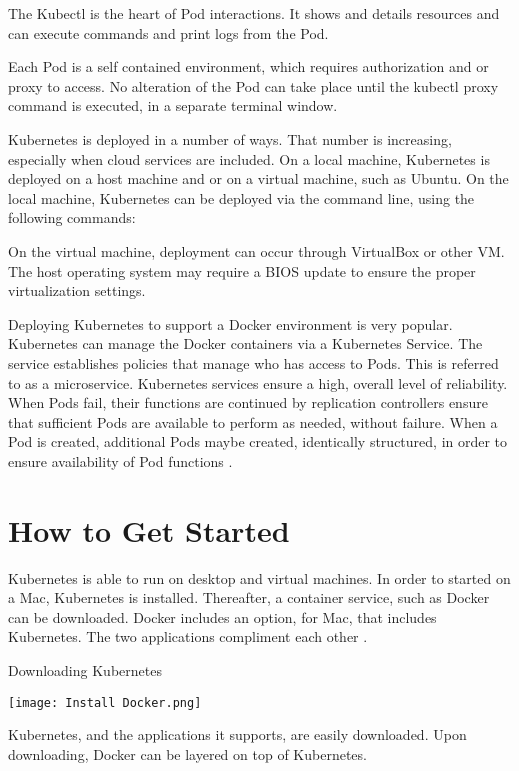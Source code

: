 \documentclass[12pt, letterpaper]{article}
\begin{document}
The Kubectl is the heart of Pod interactions.  It shows and details
resources and can execute commands and print logs from the Pod. 

Each Pod is a self contained environment, which requires authorization
and or proxy to access.  No alteration of the Pod can take place until
the kubectl proxy command is executed, in a separate terminal window.   
 


Kubernetes is deployed in a number of ways.  That number is
increasing, especially when cloud services are included.  On a local
machine, Kubernetes is deployed on a host machine and or on a virtual
machine, such as Ubuntu.  On the local machine, Kubernetes can be
deployed via the command line, using the following commands: 


On the virtual machine, deployment can occur through VirtualBox or
other VM.  The host operating system may require a BIOS update to
ensure the proper virtualization settings.   

Deploying Kubernetes to support a Docker environment is very popular.
Kubernetes can manage the Docker containers via a Kubernetes Service.
The service establishes policies that manage who has access to Pods.
This is referred to as a microservice.  Kubernetes services ensure a
high, overall level of reliability.  When Pods fail, their functions
are continued by replication controllers ensure that sufficient Pods
are available to perform as needed, without failure.  When a Pod is
created, additional Pods maybe created, identically structured, in
order to ensure availability of Pod functions
\cite{hid-sp18-525-service}.  

\section *{How to Get Started}
\setlength{\parskip}{1.6em}

Kubernetes is able to run on desktop and virtual machines.  In order
to started on a Mac, Kubernetes is installed.  Thereafter, a container
service, such as Docker can be downloaded.  Docker includes an option,
for Mac, that includes Kubernetes.  The two applications compliment
each other  \cite{hid-sp18-525-service}.  

Downloading Kubernetes
\setlength{\parskip}{1.6em}


\texttt{[image: Install Docker.png]}

Kubernetes, and the applications it supports, are easily downloaded.
Upon downloading, Docker can be layered on top of Kubernetes.   
\end{document}

